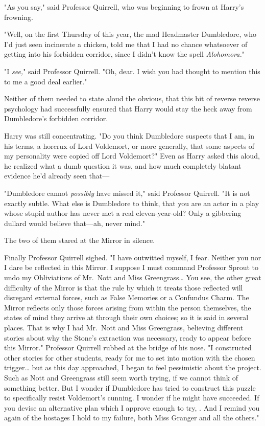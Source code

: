 "As you say," said Professor Quirrell, who was beginning to frown at Harry's
frowning.

"Well, on the first Thursday of this year, the mad Headmaster Dumbledore, who
I'd just seen incinerate a chicken, told me that I had no chance whatsoever of
getting into his forbidden corridor, since I didn't know the spell
\emph{Alohomora.}"

"I \emph{see,}" said Professor Quirrell. "Oh, dear. I wish you had thought to
mention this to me a good deal earlier."

Neither of them needed to state aloud the obvious, that this bit of reverse
reverse psychology had successfully ensured that Harry would stay the heck away
from Dumbledore's forbidden corridor.

Harry was still concentrating. "Do you think Dumbledore suspects that I am, in
his terms, a horcrux of Lord Voldemort, or more generally, that some aspects of
my personality were copied off Lord Voldemort?" Even as Harry asked this aloud,
he realized what a dumb question it was, and how much completely blatant
evidence he'd already seen that---

"Dumbledore cannot \emph{possibly} have missed it," said Professor Quirrell.
"It is not exactly subtle. What else is Dumbledore to think, that you are an
actor in a play whose stupid author has never met a real eleven-year-old? Only
a gibbering dullard would believe that---ah, never mind."

The two of them stared at the Mirror in silence.

Finally Professor Quirrell sighed. "I have outwitted myself, I fear. Neither
you nor I dare be reflected in this Mirror. I suppose I must command Professor
Sprout to undo my Obliviations of Mr.~Nott and Miss Greengrass{\ldots} You see,
the other great difficulty of the Mirror is that the rule by which it treats
those reflected will disregard external forces, such as False Memories or a
Confundus Charm. The Mirror reflects only those forces arising from within the
person themselves, the states of mind they arrive at through their own choices;
so it is said in several places. That is why I had Mr.~Nott and Miss
Greengrass, believing different stories about why the Stone's extraction was
necessary, ready to appear before this Mirror." Professor Quirrell rubbed at
the bridge of his nose. "I constructed other stories for other students, ready
for me to set into motion with the chosen trigger{\ldots} but as this day
approached, I began to feel pessimistic about the project. Such as Nott and
Greengrass still seem worth trying, if we cannot think of something better. But
I wonder if Dumbledore has tried to construct this puzzle to specifically
resist Voldemort's cunning. I wonder if he might have succeeded. If you devise
an alternative plan which I approve enough to try, . And I remind you again of the hostages I hold
to my failure, both Miss Granger and all the others."

